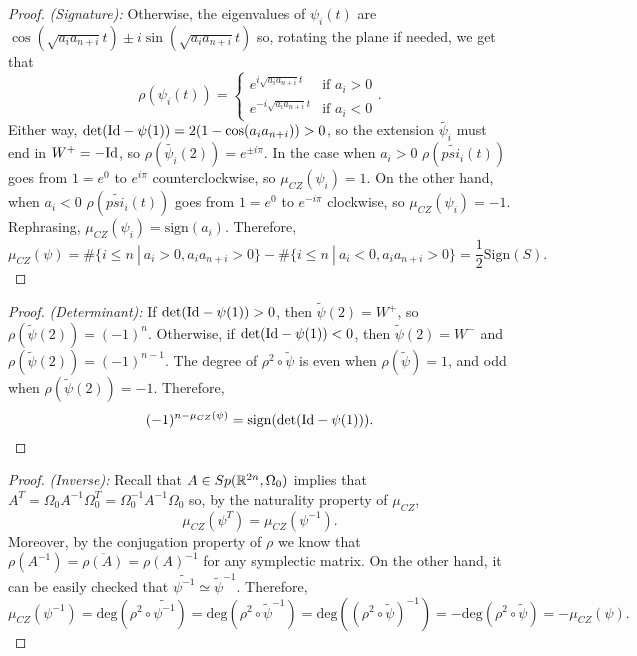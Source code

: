 \begin{proof} {\it (Signature):}
Otherwise, the eigenvalues of $\psi_i(t)$ are $\cos(\sqrt{a_ia_{n+i}}t) \pm i \sin(\sqrt{a_ia_{n+i}}t)$ so, rotating the plane if needed, we get that
\[ \rho(\psi_i(t)) = \left\{ \begin{array}{lc} e^{i \sqrt{a_ia_{n+i}} t} & \text{if } a_i > 0 \\ e^{- i \sqrt{a_ia_{n+i}} t} & \text{if } a_i < 0 \end{array} \right. .\]
Either way, $\text{det}(\text{Id} - \psi(1)) = 2(1-\cos(a_ia_{n+i})) > 0$, so the extension $\widetilde{\psi_i}$ must end in $W^+ = - \text{Id}$, so $\rho(\widetilde{\psi_i}(2)) = e^{\pm i \pi}$. In the case when $a_i > 0$ $\rho(\widetilde{psi_i}(t))$ goes from $1=e^0$ to $e^{i\pi}$ counterclockwise, so $\mu_{CZ}(\psi_i) = 1$. On the other hand, when $a_i < 0$ $\rho(\widetilde{psi_i}(t))$ goes from $1=e^0$ to $e^{-i\pi}$ clockwise, so $\mu_{CZ}(\psi_i) = -1$. Rephrasing, $\mu_{CZ}(\psi_i) = \text{sign}(a_i)$. Therefore,
\[\mu_{CZ}(\psi) = \# \{ i \leq n \ | \ a_i > 0, a_ia_{n+i} > 0 \} - \# \{ i \leq n \ | \ a_i < 0, a_ia_{n+i} > 0 \} = \frac12 \text{Sign}(S) .\]
\end{proof}

\begin{proof} {\it (Determinant):} If $\text{det}(\text{Id} - \psi(1)) > 0$, then $\widetilde{\psi}(2) = W^+$, so $\rho(\widetilde{\psi}(2)) = (-1)^n$. Otherwise, if $\text{det}(\text{Id} - \psi(1)) < 0$, then $\widetilde{\psi}(2) = W^-$ and $\rho(\widetilde{\psi}(2)) = (-1)^{n-1}$. The degree of $\rho^2 \circ \widetilde{\psi}$ is even when $\rho(\widetilde{\psi}) = 1$, and odd when $\rho(\widetilde{\psi}(2)) = -1$. Therefore,
\[(-1)^{n-\mu_{CZ}(\psi)} = \text{sign} ( \text{det}(\text{Id} - \psi(1))) .\]
\end{proof}

\begin{proof} {\it (Inverse):} Recall that $A \in Sp(\mathbb{R}^{2n},\Omega_0)$ implies that $A^T = \Omega_0 A^{-1} \Omega_0^T = \Omega_0^{-1} A^{-1} \Omega_0$ so, by the naturality property of $\mu_{CZ}$,
\[\mu_{CZ}(\psi^T) = \mu_{CZ}(\psi^{-1}) .\]
Moreover, by the conjugation property of $\rho$ we know that $\rho(A^{-1}) = \overline{\rho(A)} = \rho(A)^{-1}$ for any symplectic matrix. On the other hand, it can be easily checked that $\widetilde{\psi^{-1}} \simeq \widetilde{\psi}^{-1}$. Therefore,
\[\mu_{CZ}(\psi^{-1}) = \text{deg}(\rho^2 \circ \widetilde{\psi^{-1}}) = \text{deg}(\rho^2 \circ \widetilde{\psi}^{-1}) = \text{deg}((\rho^2 \circ \widetilde{\psi})^{-1}) = - \text{deg}(\rho^2 \circ \widetilde{\psi}) = - \mu_{CZ}(\psi) .\]
\end{proof}

